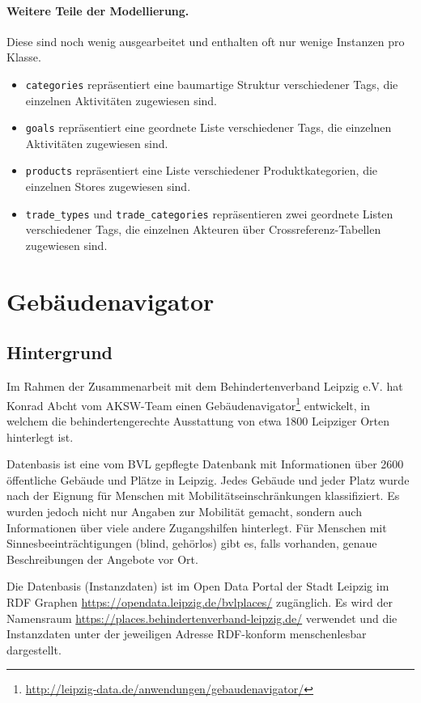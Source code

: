 \documentclass[a4paper,11pt]{article}
\begin{document}
\paragraph{Weitere Teile der Modellierung.}
Diese sind noch wenig ausgearbeitet und enthalten oft nur wenige Instanzen pro
Klasse. 
\begin{itemize}\itemsep0pt
\item \texttt{categories} repräsentiert eine baumartige Struktur verschiedener
  Tags, die einzelnen Aktivitäten zugewiesen sind.
\item \texttt{goals} repräsentiert eine geordnete Liste verschiedener Tags,
  die einzelnen Aktivitäten zugewiesen sind.
\item \texttt{products} repräsentiert eine Liste verschiedener
  Produktkategorien, die einzelnen Stores zugewiesen sind.
\item \texttt{trade\_types} und \texttt{trade\_categories} repräsentieren zwei
  geordnete Listen verschiedener Tags, die einzelnen Akteuren über 
  Crossreferenz-Tabellen zugewiesen sind.
\end{itemize}

\section{Gebäudenavigator}

\subsection{Hintergrund}
Im Rahmen der Zusammenarbeit mit dem Behindertenverband Leipzig e.V. hat Konrad
Abcht vom AKSW-Team einen
Gebäudenavigator\footnote{\url{http://leipzig-data.de/anwendungen/gebaudenavigator/}}
entwickelt, in welchem die behindertengerechte Ausstattung von etwa 1800
Leipziger Orten hinterlegt ist.

Datenbasis ist eine vom BVL gepflegte Datenbank mit Informationen über 2600
öffentliche Gebäude und Plätze in Leipzig. Jedes Gebäude und jeder Platz wurde
nach der Eignung für Menschen mit Mobilitätseinschränkungen klassifiziert. Es
wurden jedoch nicht nur Angaben zur Mobilität gemacht, sondern auch
Informationen über viele andere Zugangshilfen hinterlegt. Für Menschen mit
Sinnesbeeinträchtigungen (blind, gehörlos) gibt es, falls vorhanden, genaue
Beschreibungen der Angebote vor Ort.

Die Datenbasis (Instanzdaten) ist im Open Data Portal der Stadt Leipzig im RDF
Graphen \url{https://opendata.leipzig.de/bvlplaces/} zugänglich.  Es wird der
Namensraum \url{https://places.behindertenverband-leipzig.de/} verwendet und
die Instanzdaten unter der jeweiligen Adresse RDF-konform menschenlesbar
dargestellt. 
\end{document}
